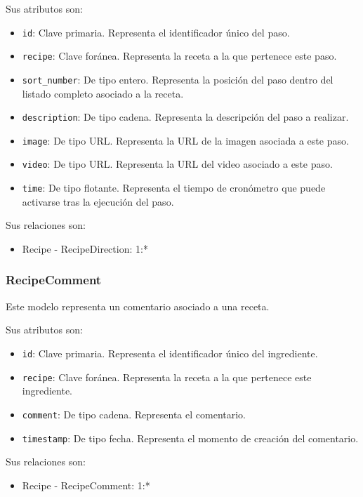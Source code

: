 Sus atributos son:
\begin{itemize}
\item \texttt{id}: Clave primaria. Representa el identificador único del
  paso.
\item \texttt{recipe}: Clave foránea. Representa la receta a la que pertenece
  este paso.
\item \texttt{sort\_number}: De tipo entero. Representa la posición del
  paso dentro del listado completo asociado a la receta.
\item \texttt{description}: De tipo cadena. Representa la descripción del paso
  a realizar.
\item \texttt{image}: De tipo URL. Representa la URL de la imagen asociada a
  este paso.
\item \texttt{video}: De tipo URL. Representa la URL del video asociado a este
  paso.
\item \texttt{time}: De tipo flotante. Representa el tiempo de cronómetro que
  puede activarse tras la ejecución del paso.
\end{itemize}

Sus relaciones son:
\begin{itemize}
\item Recipe - RecipeDirection: 1:*
\end{itemize}


\subsubsection{RecipeComment}

Este modelo representa un comentario asociado a una receta.

Sus atributos son:
\begin{itemize}
\item \texttt{id}: Clave primaria. Representa el identificador único del
  ingrediente.
\item \texttt{recipe}: Clave foránea. Representa la receta a la que pertenece
  este ingrediente.
\item \texttt{comment}: De tipo cadena. Representa el comentario.
\item \texttt{timestamp}: De tipo fecha. Representa el momento de creación del
  comentario.
\end{itemize}

Sus relaciones son:
\begin{itemize}
\item Recipe - RecipeComment: 1:*
\end{itemize}


